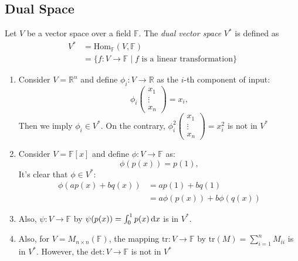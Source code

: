 \subsection{Dual Space}
\begin{definition}
Let $V$ be a vector space over a field $\mathbb{F}$. The \emph{dual vector space} $V^*$ is defined as
\begin{align*}
V^*&=\text{Hom}_{\mathbb{F}}(V,\mathbb{F})\\
&=\{f:V\to\mathbb{F}\mid \text{$f$ is a linear transformation}\}
\end{align*}
\end{definition}

\begin{example}
\begin{enumerate}
\item
Consider $V=\mathbb{R}^n$ and define $\phi_i:V\to\mathbb{R}$ as the $i$-th component of input:
\[
\phi_i\begin{pmatrix}
x_1\\\vdots\\x_n
\end{pmatrix}=x_i,
\]
Then we imply $\phi_i\in V^*$.  On the contrary, $\phi_i^2\begin{pmatrix}
x_1\\\vdots\\x_n
\end{pmatrix}=x_i^2$ is not in $V^*$
\item
Consider $V=\mathbb{F}[x]$ and define $\phi:V\to\mathbb{F}$ as:
\[
\phi(p(x))=p(1),
\]
It's clear that $\phi\in V^*$:
\begin{align*}
\phi(ap(x)+bq(x))&=ap(1)+bq(1)\\
&=a\phi(p(x))+b\phi(q(x))
\end{align*}
\item
Also, $\psi:V\to\mathbb{F}$ by $\psi(p(x))=\int_0^1p(x)\,\mathrm{d} x$ is in $V^*$.
\item
Also, for $V=M_{n\times n}(\mathbb{F})$, the mapping $\text{tr}:V\to\mathbb{F}$ by $\text{tr}(M)=\sum_{i=1}^nM_{ii}$ is in $V^*$. However, the $\text{det}:V\to\mathbb{F}$ is not in $V^*$
\end{enumerate}
\end{example}


